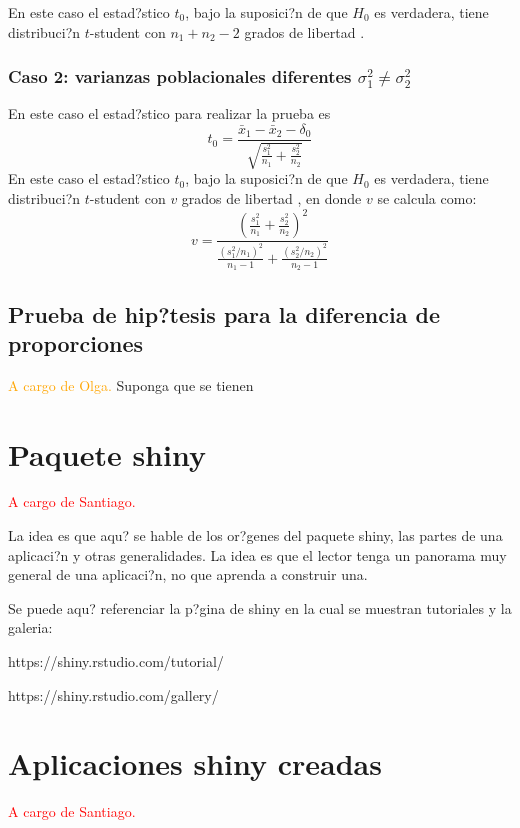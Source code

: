 \documentclass[]{comunicaciones}
\newcommand{\pkg}[1]{{\normalfont\fontseries{b}\selectfont #1}}
\begin{document}
En este caso el estad?stico $t_0$, bajo la suposici?n de que $H_0$ es verdadera, tiene distribuci?n $t$-student con $n_1+n_2-2$ grados de libertad \cite{Walpole12}.

\subsubsection{Caso 2: varianzas poblacionales diferentes $\sigma_1^2 \neq \sigma_2^2$}
En este caso el estad?stico para realizar la prueba es 
$$t_0=\frac{\bar{x}_1 - \bar{x}_2 - \delta_0}{\sqrt{\frac{s_1^2}{n_1} + \frac{s_2^2}{n_2}}}$$
En este caso el estad?stico $t_0$, bajo la suposici?n de que $H_0$ es verdadera, tiene distribuci?n $t$-student con $v$ grados de libertad \cite{Walpole12}, en donde $v$ se calcula como:
$$v=\frac{ \left( \frac{s_1^2}{n_1} + \frac{s_2^2}{n_2} \right)^2 }{ \frac{(s_1^2/n_1)^2}{n_1-1} + \frac{(s_2^2/n_2)^2}{n_2-1}}$$

\subsection{Prueba de hip?tesis para la diferencia de proporciones}
\textcolor{orange}{A cargo de Olga.}
Suponga que se tienen 

\section{Paquete \pkg{shiny}}
\textcolor{red}{A cargo de Santiago.}

La idea es que aqu? se hable de los or?genes del paquete shiny, las partes de una aplicaci?n y otras generalidades. La idea es que el lector tenga un panorama muy general de una aplicaci?n, no que aprenda a construir una.

Se puede aqu? referenciar la p?gina de shiny en la cual se muestran tutoriales y la galeria:

https://shiny.rstudio.com/tutorial/

https://shiny.rstudio.com/gallery/

\section{Aplicaciones \pkg{shiny} creadas}
\textcolor{red}{A cargo de Santiago.}
\end{document}
